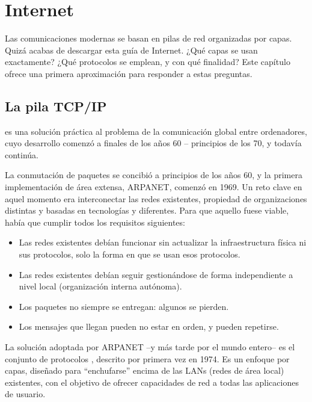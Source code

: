 
\chapter{Internet}\label{sec:internet}

Las comunicaciones modernas se basan en pilas de red organizadas por capas. 
Quizá acabas de descargar esta guía de Internet.
% 
¿Qué capas se usan exactamente? ¿Qué protocolos se emplean, y con qué finalidad?
% 
Este capítulo ofrece una primera aproximación para responder a estas preguntas.\\[-1cm]

\section{La pila TCP/IP}\label{sec:internet:the_tcp_ip_stack}


 es una solución práctica al problema de la comunicación global entre ordenadores,
cuyo desarrollo comenzó a finales de los años 60 -- principios de los 70, y todavía continúa.

La conmutación de paquetes se concibió a principios de los años 60, y la primera 
implementación de área extensa, ARPANET, comenzó en 1969. 
% 
Un reto clave en aquel momento era interconectar las redes existentes, 
propiedad de organizaciones distintas y basadas en tecnologías y  diferentes.
% 
Para que aquello fuese viable, había que cumplir todos los requisitos siguientes:
\begin{itemize}
    \item Las redes existentes debían funcionar sin actualizar la infraestructura física 
      ni sus protocolos, solo la forma en que se usan esos protocolos.
    \item Las redes existentes debían seguir gestionándose de forma independiente a nivel local (organización interna autónoma).
    \item Los paquetes no siempre se entregan: algunos se pierden.
    \item Los mensajes que llegan pueden no estar en orden, y pueden repetirse.
\end{itemize}

La solución adoptada por ARPANET --y más tarde por el mundo entero-- 
es el conjunto de protocolos , descrito por primera vez en 1974. 
Es un enfoque por capas, diseñado para ``enchufarse'' encima de 
las LANs (redes de área local) existentes, con el objetivo de ofrecer 
capacidades de red a todas las aplicaciones de usuario.

